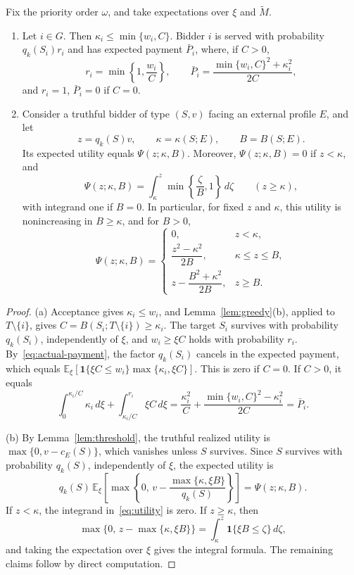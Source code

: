 \documentclass[format=acmsmall, review=false]{acmart}
\newcommand{\E}{\mathbb{E}}
\begin{document}
\begin{lemma}
\label{lem:interim}
Fix the priority order \(\omega\), and take expectations over
\(\xi\) and \(\widetilde M\).
\begin{enumerate}
\item[(a)] Let \(i\in G\). Then
\(\kappa_i\le\min\{w_i,C\}\). Bidder \(i\) is served with
probability \(q_k(S_i)r_i\) and has expected payment \(\bar P_i\),
where, if \(C>0\),
\begin{equation}\label{eq:retention-payment}
r_i=\min\left\{1,\frac{w_i}{C}\right\},
\qquad
\bar P_i=\frac{\min\{w_i,C\}^2+\kappa_i^2}{2C},
\end{equation}
and \(r_i=1\), \(\bar P_i=0\) if \(C=0\).
\item[(b)] Consider a truthful bidder of type \((S,v)\) facing an
external profile \(E\), and let
\[
z=q_k(S)v,
\qquad
\kappa=\kappa(S;E),
\qquad
B=B(S;E).
\]
Its expected utility equals \(\Psi(z;\kappa,B)\). Moreover,
\(\Psi(z;\kappa,B)=0\) if \(z<\kappa\), and
\[
\Psi(z;\kappa,B)
=\int_\kappa^z\min\left\{\frac{\zeta}{B},1\right\}\,d\zeta
\qquad(z\ge\kappa),
\]
with integrand one if \(B=0\). In particular, for fixed \(z\) and
\(\kappa\), this utility is nonincreasing in \(B\ge\kappa\), and
for \(B>0\),
\[
\Psi(z;\kappa,B)=
\begin{cases}
0,&z<\kappa,\\[1mm]
\dfrac{z^2-\kappa^2}{2B},&\kappa\le z\le B,\\[3mm]
z-\dfrac{B^2+\kappa^2}{2B},&z\ge B.
\end{cases}
\]
\end{enumerate}
\end{lemma}

\begin{proof}
(a) Acceptance gives \(\kappa_i\le w_i\), and
Lemma~\ref{lem:greedy}(b), applied to \(T\setminus\{i\}\), gives
\(C=B(S_i;T\setminus\{i\})\ge\kappa_i\). The target \(S_i\)
survives with probability \(q_k(S_i)\), independently of \(\xi\),
and \(w_i\ge\xi C\) holds with probability \(r_i\).
By~\eqref{eq:actual-payment}, the factor \(q_k(S_i)\) cancels in
the expected payment, which equals
\(\E_\xi[\mathbf{1}\{\xi C\le w_i\}\max\{\kappa_i,\xi C\}]\).
This is zero if \(C=0\). If \(C>0\), it equals
\[
\int_0^{\kappa_i/C}\kappa_i\,d\xi
+\int_{\kappa_i/C}^{r_i}\xi C\,d\xi
=\frac{\kappa_i^2}{C}
+\frac{\min\{w_i,C\}^2-\kappa_i^2}{2C}
=\bar P_i.
\]

(b) By Lemma~\ref{lem:threshold}, the truthful realized utility
is \(\max\{0,v-c_E(S)\}\), which vanishes unless \(S\) survives.
Since \(S\) survives with probability \(q_k(S)\), independently
of \(\xi\), the expected utility is
\[
q_k(S)\,
\E_\xi\!\left[
\max\left\{0,\,
v-\frac{\max\{\kappa,\xi B\}}{q_k(S)}\right\}
\right]
=\Psi(z;\kappa,B).
\]
If \(z<\kappa\), the integrand in~\eqref{eq:utility} is zero. If
\(z\ge\kappa\), then
\[
\max\{0,\,z-\max\{\kappa,\xi B\}\}
=\int_\kappa^z\mathbf{1}\{\xi B\le\zeta\}\,d\zeta,
\]
and taking the expectation over \(\xi\) gives the integral
formula. The remaining claims follow by direct computation.
\end{proof}
\end{document}
